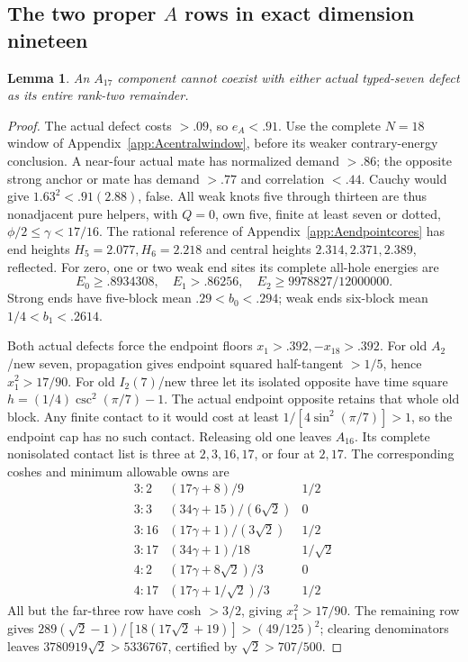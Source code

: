 \documentclass[11pt]{article}
\newtheorem{lemma}[theorem]{Lemma}
\theoremstyle{definition}
\theoremstyle{remark}
\begin{document}
\subsection[The two proper A rows in exact dimension nineteen]{The two proper $A$ rows in exact dimension nineteen}
\begin{lemma}\label{app:tail:lem:A17typed}
An $A_{17}$ component cannot coexist with either actual typed-seven
defect as its entire rank-two remainder.
\end{lemma}
\begin{proof}
The actual defect costs $>.09$, so $e_A<.91$. Use the complete
$N=18$ window of Appendix~\ref{app:Acentralwindow}, before its
weaker contrary-energy conclusion. A near-four actual mate has
normalized demand $>.86$; the opposite strong anchor or mate
has demand $>.77$ and correlation $<.44$.
Cauchy would give $1.63^2<.91(2.88)$, false.
All weak knots five through thirteen are thus nonadjacent pure
helpers, with $Q=0$, own five, finite at least seven or dotted,
$\phi/2\le\gamma<17/16$.
The rational reference of Appendix~\ref{app:Aendpointcores}
has end heights $H_5=2.077,H_6=2.218$ and central heights
$2.314,2.371,2.389$, reflected. For zero, one or two weak end
sites its complete all-hole energies are
\[
 E_0\ge.8934308,\quad E_1>.86256,\quad
 E_2\ge9978827/12000000.
\]
Strong ends have five-block mean $.29<b_0<.294$;
weak ends six-block mean $1/4<b_1<.2614$.

Both actual defects force the endpoint floors
$x_1>.392,-x_{18}>.392$.
For old $A_2$/new seven, propagation gives endpoint squared
half-tangent $>1/5$, hence $x_1^2>17/90$.
For old $I_2(7)$/new three let its isolated opposite have
time square $h=(1/4)\csc^2(\pi/7)-1$.
The actual endpoint opposite retains that whole old block.
Any finite contact to it would cost at least
$1/[4\sin^2(\pi/7)]>1$, so the endpoint cap has no such contact.
Releasing old one leaves $A_{16}$. Its complete nonisolated
contact list is three at $2,3,16,17$, or four at $2,17$.
The corresponding coshes and minimum allowable owns are
\[
\begin{array}{c|c|c}
3:2&(17\gamma+8)/9&1/2\\
3:3&(34\gamma+15)/(6\sqrt2)&0\\
3:16&(17\gamma+1)/(3\sqrt2)&1/2\\
3:17&(34\gamma+1)/18&1/\sqrt2\\
4:2&(17\gamma+8\sqrt2)/3&0\\
4:17&(17\gamma+1/\sqrt2)/3&1/2
\end{array}
\]
All but the far-three row have cosh $>3/2$, giving
$x_1^2>17/90$. The remaining row gives
$289(\sqrt2-1)/[18(17\sqrt2+19)]>(49/125)^2$;
clearing denominators leaves
$3780919\sqrt2>5336767$, certified by $\sqrt2>707/500$.


\end{proof}
\end{document}
